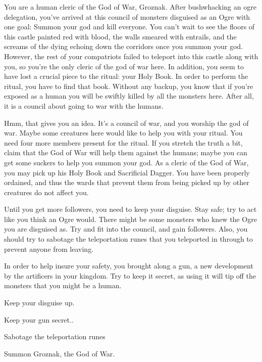 \documentclass[char]{guildcamp2}
\begin{document}
\name{\cCleric{}}


	You are a human cleric of the God of War, Groznak. After bushwhacking an ogre delegation, you've arrived at this council of monsters disguised as an Ogre with one goal: Summon your god and kill everyone. You can't wait to see the floors of this castle painted red with blood, the walls smeared with entrails, and the screams of the dying echoing down the corridors once you summon your god. However, the rest of your compatriots failed to teleport into this castle along with you, so you're the only cleric of the god of war here. In addition, you seem to have lost a crucial piece to the ritual: your Holy Book. In order to perform the ritual, you have to find that book. Without any backup, you know that if you're exposed as a human you will be swiftly killed by all the monsters here. After all, it is a council about going to war with the humans.
		
	Hmm, that gives you an idea. It's a council of war, and you worship the god of war. Maybe some creatures here would like to help you with your ritual. You need four more members present for the ritual. If you stretch the truth a bit, claim that the God of War will help them against the humans; maybe you can get some suckers to help you summon your god. As a cleric of the God of War, you may pick up his Holy Book and Sacrificial Dagger. You have been properly ordained, and thus the wards that prevent them from being picked up by other creatures do not affect you.
	
	Until you get more followers, you need to keep your disguise. Stay safe; try to act like you think an Ogre would. There might be some monsters who knew the Ogre you are disguised as. Try and fit into the council, and gain followers. Also, you should try to sabotage the teleportation runes that you teleported in through to prevent anyone from leaving.
	
	In order to help insure your safety, you brought along a gun, a new development by the artificers in your kingdom.  Try to keep it secret, as using it will tip off the monsters that you might be a human.

\begin{itemz}[Goals]
  \item Keep your disguise up.
  \item Keep your gun secret..
  \item Sabotage the teleportation runes
	\item Summon Groznak, the God of War.
\end{itemz}
\end{document}
